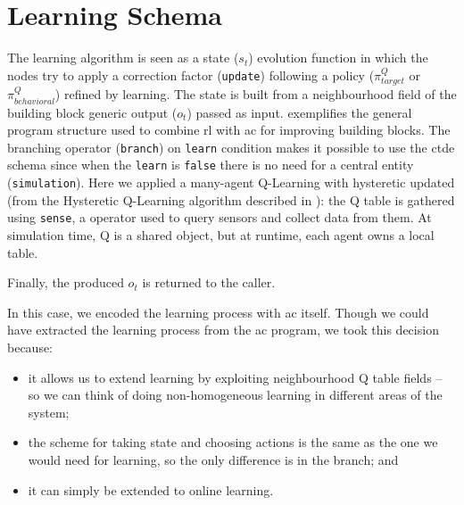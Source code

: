\section{Learning Schema} 
The learning algorithm is seen as a state ($s_t$) evolution function in which the nodes try to apply a correction factor (\lstinline|update|) following a policy ($\pi^Q_{target}$ or $\pi^Q_{behavioral}$) refined by learning.
%
The state is built from a neighbourhood field of the building block generic output ($o_t$) passed as input.
%
 exemplifies the general program structure used to combine \ac{rl} with \ac{ac} for improving building blocks.
%
The branching operator (\lstinline|branch|) on \lstinline|learn| condition makes it possible to use the \ac{ctde} schema since when the \lstinline|learn| is \lstinline|false| there is no need for a central entity (\lstinline|simulation|).
%
Here we applied a many-agent Q-Learning with hysteretic updated (from the Hysteretic Q-Learning algorithm described in ):
the Q table is gathered using \lstinline|sense|, a \scafi{} operator used to query sensors and collect data from them. 
%
At simulation time, Q is a shared object, 
 but at runtime, each agent owns a local table.
%

%
Finally, the produced $o_{t}$ is returned to the caller.

In this case, we encoded the learning process with \ac{ac} itself. 
%
Though we could have extracted the learning process from the \ac{ac} program, %
 we took this decision because: 
\begin{itemize}
  \item it allows us to extend learning by exploiting neighbourhood Q table fields -- so we can think of doing non-homogeneous learning in different areas of the system;
  \item the scheme for taking state and choosing actions is the same as the one we would need for learning, so the only difference is in the branch; and
  \item it can simply be extended to online learning.
\end{itemize}
%


